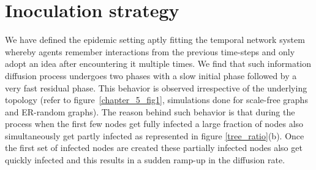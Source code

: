 \noindent

\section{Inoculation strategy}

%  


We have defined the epidemic setting aptly fitting the temporal network system whereby agents remember
interactions from the previous time-steps and only adopt an idea after encountering it multiple times. 
We find that such information diffusion process undergoes two phases with a slow initial phase followed by a very fast residual phase. This behavior is observed 
irrespective of the underlying topology (refer to figure~\ref{chapter_5_fig1}, simulations done for scale-free graphs and ER-random graphs).
 The reason behind such behavior is that during the process when the first few nodes get fully infected a large fraction of nodes also simultaneously get partly infected as 
represented in figure \ref{tree_ratio}(b). Once the first set of infected nodes are created these partially infected nodes also get quickly infected and this 
results in a sudden ramp-up in the diffusion rate.

